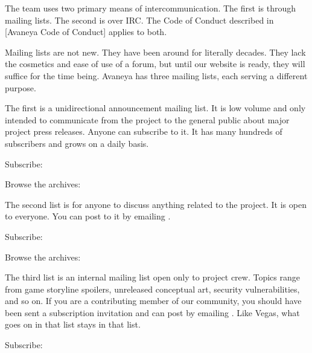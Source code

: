 
The team uses two primary means of intercommunication. The first is through mailing lists. The second is over IRC. The Code of Conduct described in [Avaneya Code of Conduct] applies to both.

Mailing lists are not new. They have been around for literally decades. They lack the cosmetics and ease of use of a forum, but until our website is ready, they will suffice for the time being. Avaneya has three mailing lists, each serving a different purpose.

The first is a unidirectional announcement mailing list. It is low volume and only intended to communicate from the project to the general public about major project press releases. Anyone can subscribe to it. It has many hundreds of subscribers and grows on a daily basis.

\blank[2*big]
\startnarrower[3*left]
Subscribe:\crlf
{} 

\blank[2*big]
Browse the archives:\crlf
{}
\stopnarrower
\crlf

The second list is for anyone to discuss anything related to the project. It is open to everyone. You can post to it by emailing .

\blank[2*big]
\startnarrower[3*left]
Subscribe:\crlf
{} 

\blank[2*big]
Browse the archives:\crlf
{}
\stopnarrower
\crlf

The third list is an internal mailing list open only to project crew. Topics range from game storyline spoilers, unreleased conceptual art, security vulnerabilities, and so on. If you are a contributing member of our community, you should have been sent a subscription invitation and can post by emailing . Like Vegas, what goes on in that list stays in that list.

\blank[2*big]
\startnarrower[3*left]
Subscribe:\crlf
{} 

